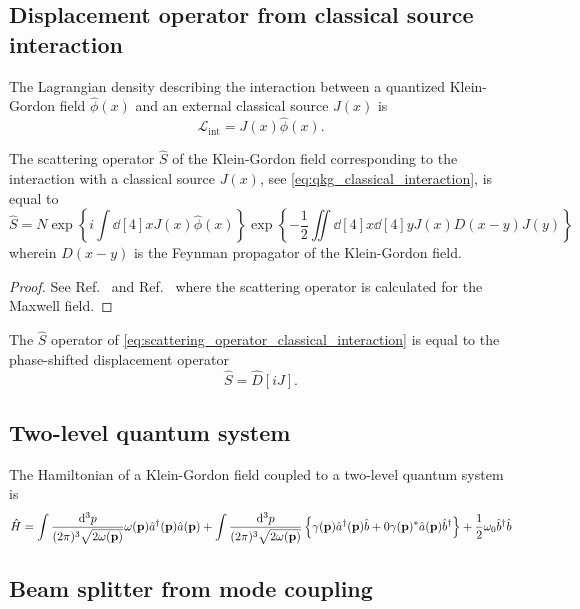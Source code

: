 \subsection{Displacement operator from classical source interaction}

\begin{definition}
	The Lagrangian density describing the interaction between a quantized Klein-Gordon field $\hat\phi(x)$ and an external classical source $J(x)$ is
	\begin{equation}
		\mathcal{L}_\text{int}
		=
		J(x)
		\hat\phi(x)
		\label{eq:qkg_classical_interaction}
		.
	\end{equation}
\end{definition}
\begin{theorem}
	The scattering operator $\hat{S}$ of the Klein-Gordon field corresponding to the interaction with a classical source $J(x)$, see \cref{eq:qkg_classical_interaction}, is equal to
	\begin{equation}
		\hat{S}
		=
		N\exp\left\{
			i\int\dd[4]{x}
			J(x)
			\hat\phi(x)
		\right\}
		\exp\left\{
			-
			\frac{1}{2}
			\iint\dd[4]{x}\dd[4]{y}
			J(x)
			D(x-y)
			J(y)
		\right\}
		\label{eq:scattering_operator_classical_interaction}
	\end{equation}
	wherein $D(x-y)$ is the Feynman propagator of the Klein-Gordon field.
\end{theorem}
\begin{proof}
	See Ref.~\cite{Zhang1999} and Ref.~\cite[p.~180]{Itzykson2012} where the scattering operator is calculated for the Maxwell field.
\end{proof}
\begin{theorem}\label{thm:displacement_scattering_operator_equivalence}
	The $\hat{S}$ operator of \cref{eq:scattering_operator_classical_interaction} is equal to the phase-shifted displacement operator
	\begin{equation}
		\hat{S}
		=
		\hat{D}[iJ]
		.
	\end{equation}
\end{theorem}

\subsection{Two-level quantum system}

\begin{example}
	The Hamiltonian of a Klein-Gordon field coupled to a two-level quantum system is
	\begin{equation}
		\hat{H}
		=
		\int\frac{\dd[3]{p}}{(2\pi)^3\sqrt{2\omega(\vb{p})}}
		\omega(\vb{p})
		\hat{a}^\dagger(\vb{p})
		\hat{a}(\vb{p})
		+
		\int\frac{\dd[3]{p}}{(2\pi)^3\sqrt{2\omega(\vb{p})}}
		\left\{
			\gamma(\vb{p})
			\hat{a}^\dagger(\vb{p})
			\hat{b}
			+0
			\gamma(\vb{p})^*
			\hat{a}(\vb{p})
			\hat{b}^\dagger
		\right\}
		+
		\frac{1}{2}
		\omega_0
		\hat{b}^\dagger
		\hat{b}
	\end{equation}
\end{example}

\subsection{Beam splitter from mode coupling}